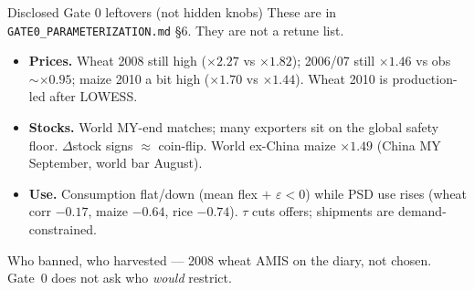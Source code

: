 \begin{frame}{Disclosed Gate 0 leftovers (not hidden knobs)}
These are in \texttt{GATE0\_PARAMETERIZATION.md} \S6. They are not a
retune list.

\begin{itemize}
\item \textbf{Prices.} Wheat 2008 still high ($\times 2.27$ vs $\times 1.82$);
      2006/07 still $\times 1.46$ vs obs $\sim\times 0.95$; maize 2010 a bit
      high ($\times 1.70$ vs $\times 1.44$). Wheat 2010 is production-led
      after LOWESS.
\item \textbf{Stocks.} World MY-end matches; many exporters sit on the
      global safety floor. $\Delta$stock signs $\approx$ coin-flip.
      World ex-China maize $\times 1.49$ (China MY September, world bar August).
\item \textbf{Use.} Consumption flat/down (mean flex $+$ $\varepsilon<0$)
      while PSD use rises (wheat corr $-0.17$, maize $-0.64$, rice $-0.74$).
      $\tau$ cuts offers; shipments are demand-constrained.
\end{itemize}
\end{frame}

\begin{frame}{Who banned, who harvested --- 2008 wheat}
{\scriptsize AMIS on the diary, not chosen. Gate~0 does not ask who
\emph{would} restrict.}
\end{frame}
